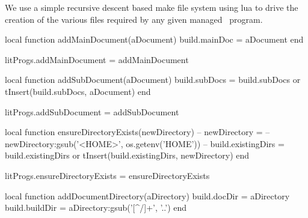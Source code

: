 
\startchapter[title=Lua Make System Files]

We use a simple recursive descent based make file system using lua to 
drive the creation of the various files required by any given 
 managed \ConTeXt\ program. 

\startMkIVCode
\def\addMainDocument#1{
  \directlua{
    thirddata.literateProgs.addMainDocument('#1')
  }
}

\def\addSubDocument#1{
  \directlua{
    thirddata.literateProgs.addSubDocument('#1')
  }
}

\def\ensureDirectoryExists#1{
  \directlua{
    thirddata.literateProgs.ensureDirectoryExists('#1')
  }
}

\def\addDocumentDirectory#1{
  \directlua{
    thirddata.literateProgs.addDocumentDirectory('#1')
  }
}

\def\addConTeXtModuleDirectory#1{
  \directlua{
    thirddata.literateProgs.addConTeXtModuleDirectory('#1')
  }
}

\def\addCCodeProgram#1{%
  \directlua{
    thirddata.literateProgs.addCCodeProgram('#1')
  }
}

\def\addCCodeLibDirectory#1{%
  \directlua{
    thirddata.literateProgs.addCCodeLibDirectory('#1')
  }
}

\def\addCCodeLib#1{%
  \directlua{
    thirddata.literateProgs.addCCodeLib('#1')
  }
}

\def\addCCodeTargets#1{%
  \directlua{
    thirddata.literateProgs.addCCodeTargets('#1')
  }
}
\stopMkIVCode

\startLuaCode
local function addMainDocument(aDocument)
  build.mainDoc = aDocument
end

litProgs.addMainDocument = addMainDocument

local function addSubDocument(aDocument)
  build.subDocs = build.subDocs or { }
  tInsert(build.subDocs, aDocument)
end

litProgs.addSubDocument = addSubDocument

local function ensureDirectoryExists(newDirectory)
--  newDirectory =
--    newDirectory:gsub('<HOME>', os.getenv('HOME'))
--  build.existingDirs = build.existingDirs or { }
  tInsert(build.existingDirs, newDirectory)
end

litProgs.ensureDirectoryExists = ensureDirectoryExists

local function addDocumentDirectory(aDirectory)
  build.docDir   = aDirectory
  build.buildDir = aDirectory:gsub('[^/]+', '..')
end

